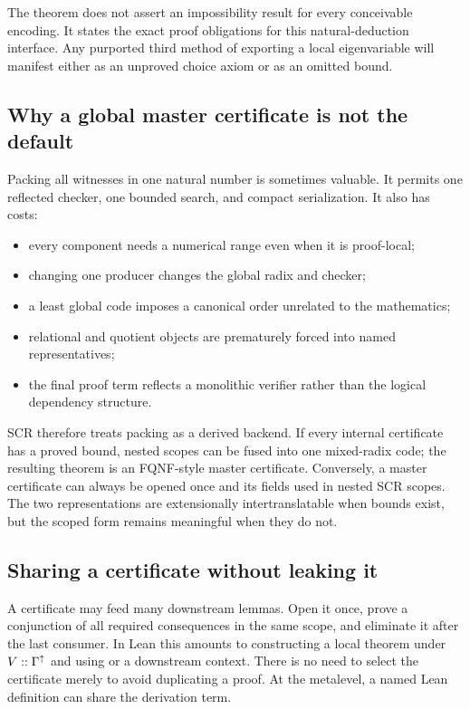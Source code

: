 The theorem does not assert an impossibility result for every conceivable
encoding.  It states the exact proof obligations for this natural-deduction
interface.  Any purported third method of exporting a local eigenvariable
will manifest either as an unproved choice axiom or as an omitted bound.

\subsection{Why a global master certificate is not the default}

Packing all witnesses in one natural number is sometimes valuable.  It permits
one reflected checker, one bounded search, and compact serialization.  It also
has costs:
\begin{itemize}
\item every component needs a numerical range even when it is proof-local;
\item changing one producer changes the global radix and checker;
\item a least global code imposes a canonical order unrelated to the
      mathematics;
\item relational and quotient objects are prematurely forced into named
      representatives;
\item the final proof term reflects a monolithic verifier rather than the
      logical dependency structure.
\end{itemize}
SCR therefore treats packing as a derived backend.  If every internal
certificate has a proved bound, nested scopes can be fused into one mixed-radix
code; the resulting theorem is an FQNF-style master certificate.  Conversely,
a master certificate can always be opened once and its fields used in nested
SCR scopes.  The two representations are extensionally intertranslatable when
bounds exist, but the scoped form remains meaningful when they do not.

\subsection{Sharing a certificate without leaking it}

A certificate may feed many downstream lemmas.  Open it once, prove a
conjunction of all required consequences in the same scope, and eliminate it
after the last consumer.  In Lean this amounts to constructing a local theorem
under \(V::\Gamma^{\mathord{\uparrow}}\) and using  or a downstream context.
There is no need to select the certificate merely to avoid duplicating a proof.
At the metalevel, a named Lean definition can share the derivation term.

